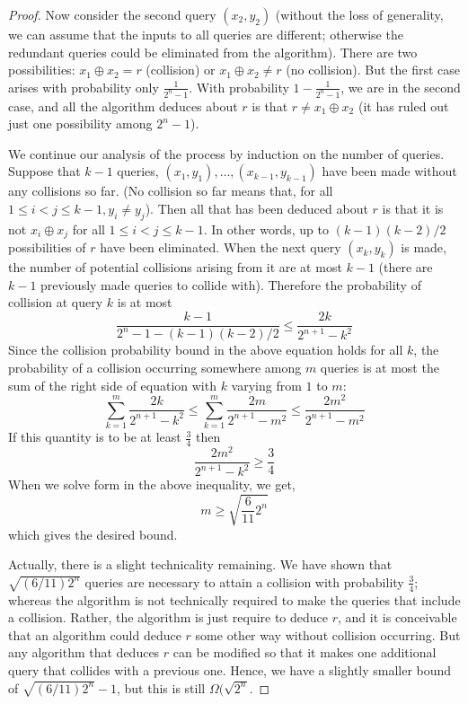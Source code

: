 \begin{proof}
    Now consider the second query $(x_2,y_2)$ (without the loss of generality, we can assume that the inputs to all queries are different; otherwise the redundant queries could be eliminated from the algorithm). There are two possibilities: $x_1 \oplus x_2 =r$ (collision) or $x_1\oplus x_2 \neq r$ (no collision). But the first case arises with probability only $\frac{1}{2^n-1}$. With probability $1-\frac{1}{2^n-1}$, we are in the second case, and all the algorithm deduces about $r$ is that $r\neq x_1\oplus x_2$ (it has ruled out just one possibility among $2^n-1$).

    We continue our analysis of the process by induction on the number of queries. Suppose that $k-1$ queries, $(x_1,y_1),\ldots,(x_{k-1},y_{k-1})$ have been made without any collisions so far. (No collision so far means that, for all $1\leq i<j\leq k-1, y_i\neq y_j$). Then all that has been deduced about $r$ is that it is not $x_i \oplus x_j$ for all $1\leq i<j\leq k-1$. In other words, up to $(k-1)(k-2)/2$ possibilities of $r$ have been eliminated. When the next query $(x_k,y_k)$ is made, the number of potential collisions arising from it are at most $k-1$ (there are $k-1$ previously made queries to collide with). Therefore the probability of collision at query $k$ is at most
    \[
    \frac{k-1}{2^n-1-(k-1)(k-2)/2} \leq \frac{2k}{2^{n+1}-k^2}
    \]
    Since the collision probability bound in the above equation holds for all $k$, the probability of a collision occurring somewhere among $m$ queries is at most the sum of the right side of equation with $k$ varying from $1$ to $m$:
    \[
    \sum_{k=1}^m \frac{2k}{2^{n+1}-k^2} \leq \sum_{k=1}^m \frac{2m}{2^{n+1}-m^2} \leq \frac{2m^2}{2^{n+1}-m^2}
    \]
    If this quantity is to be at least $\frac{3}{4}$ then
    \[
    \frac{2m^2}{2^{n+1}-k^2} \geq \frac{3}{4}
    \]
    When we solve form in the above inequality, we get,
    \[
    m\geq \sqrt{\frac{6}{11}2^n}
    \]
    which gives the desired bound.

    Actually, there is a slight technicality remaining. We have shown that $\sqrt{(6/11)2^n}$ queries are necessary to attain a collision with probability $\frac{3}{4}$; whereas the algorithm is not technically required to make the queries that include a collision. Rather, the algorithm is just require to deduce $r$, and it is conceivable that an algorithm could deduce $r$ some other way without collision occurring. But any algorithm that deduces $r$ can be modified so that it makes one additional query that collides with a previous one. Hence, we have a slightly smaller bound of $\sqrt{(6/11)2^n}-1$, but this is still $\Omega(\sqrt{2^n}$.
\end{proof}
